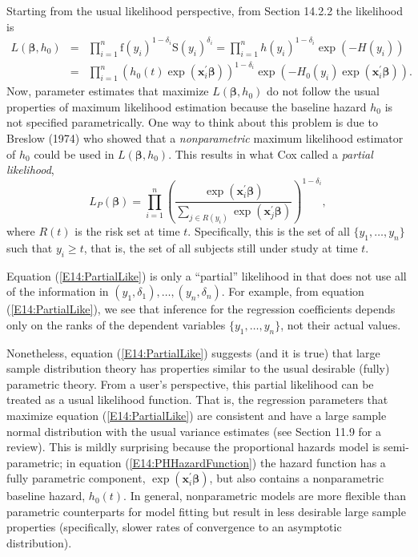 Starting from the usual likelihood perspective, from Section 14.2.2
the likelihood is
\begin{eqnarray*}
L(\boldsymbol \beta , h_0)&= & \prod_{i=1}^n
\mathrm{f}(y_i)^{1-\delta_i} \mathrm{S}(y_i)^{\delta_i} =
\prod_{i=1}^n h(y_i)^{1-\delta_i} \exp(-H(y_i))
 \\
&= & \prod_{i=1}^n \left( h_0(t) \exp( \mathbf{x}_i^{\prime}
\boldsymbol \beta ) \right)^{1-\delta_i} \exp\left(-H_0(y_i)\exp(
\mathbf{x}_i^{\prime} \boldsymbol \beta ) \right) .
\end{eqnarray*}
Now, parameter estimates that maximize $L(\boldsymbol \beta , h_0)$
do not follow the usual properties of maximum likelihood estimation
because the baseline hazard $h_0$ is not specified parametrically.
One way to think about this problem is due to Breslow (1974) who
showed that a \emph{nonparametric} maximum likelihood estimator of
$h_0$ could be used in $L(\boldsymbol \beta , h_0)$. This results in
what Cox called a \emph{partial likelihood},
\begin{equation}\label{E14:PartialLike}
L_P(\boldsymbol \beta)
 = \prod_{i=1}^n
\left( \frac{\exp( \mathbf{x}_i^{\prime} \boldsymbol \beta )}
{\sum_{j \in R(y_i)} \exp( \mathbf{x}_j^{\prime} \boldsymbol \beta )
}\right)^{1-\delta_i},
\end{equation}
where $R(t)$ is the risk set at time $t$. Specifically, this is the
set of all $\{y_1, \ldots, y_n \}$ such that $y_i \geq t $, that is,
the set of all subjects still under study at time $t$.


Equation (\ref{E14:PartialLike}) is only a ``partial'' likelihood in
that does not use all of the information in  $(y_1, \delta_1),
\ldots, (y_n, \delta_n)$. For example, from equation
(\ref{E14:PartialLike}), we see that inference for the regression
coefficients depends only on the ranks of the dependent variables
$\{y_1, \ldots, y_n \}$, not their actual values.

Nonetheless, equation (\ref{E14:PartialLike}) suggests (and it is
true) that large sample distribution theory has properties similar
to the usual desirable (fully) parametric theory. From a user's
perspective, this partial likelihood can be treated as a usual
likelihood function. That is, the regression parameters that
maximize equation (\ref{E14:PartialLike}) are consistent and have a
large sample normal distribution with the usual variance estimates
(see Section 11.9 for a review). This is mildly surprising because
the proportional hazards model is semi-parametric; in equation
(\ref{E14:PHHazardFunction}) the hazard function has a fully
parametric component, $\exp( \mathbf{x}_i^{\prime} \boldsymbol \beta
)$, but also contains a nonparametric baseline hazard, $h_0(t)$. In
general, nonparametric models are more flexible than parametric
counterparts for model fitting but result in less desirable large
sample properties (specifically, slower rates of convergence to an
asymptotic distribution).


